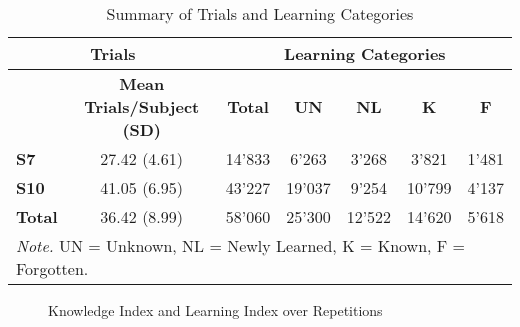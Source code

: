 \begin{table}[H]
\centering
\begin{tabular}{lcccccc}
\multicolumn{2}{c}{\textbf{Trials}}                & \multicolumn{5}{c}{\textbf{Learning Categories}}                     \\ \hline
               & \textbf{Mean Trials/Subject (SD)} & \textbf{Total} & \textbf{UN} & \textbf{NL} & \textbf{K} & \textbf{F} \\ \cline{2-7} 
\textbf{S7}    & 27.42 (4.61)                      & 14'833         & 6'263       & 3'268       & 3'821      & 1'481      \\
\textbf{S10}   & 41.05 (6.95)                      & 43'227         & 19'037      & 9'254       & 10'799     & 4'137      \\
\textbf{Total} & 36.42 (8.99)                      & 58'060         & 25'300      & 12'522      & 14'620     & 5'618      \\ \hline 
\multicolumn{7}{l}{\small \textit{Note.} UN = Unknown, NL = Newly Learned, K = Known, F = Forgotten.}
\end{tabular}
\caption{Summary of Trials and Learning Categories}
\label{tab:my_label}
\end{table}
\begin{figure}[H]
    \centering
       
    \caption{Knowledge Index and Learning Index over Repetitions}
    \label{fig:KI_LI}
\end{figure}